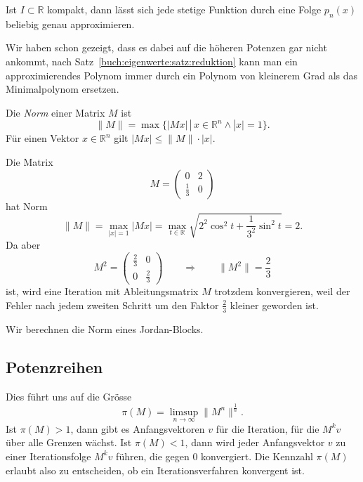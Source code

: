 \begin{satz}
Ist $I\subset\mathbb{R}$ kompakt, dann lässt sich jede stetige Funktion
durch eine Folge $p_n(x)$ beliebig genau approximieren.
\end{satz}

Wir haben schon gezeigt, dass es dabei auf die höheren Potenzen gar nicht
ankommt, nach Satz~\ref{buch:eigenwerte:satz:reduktion} kann man ein
approximierendes Polynom immer durch ein Polynom von kleinerem Grad
als das Minimalpolynom ersetzen.

\begin{definition}
%
Die {\em Norm} einer Matrix $M$ ist
\[
\|M\|
=
\max\{|Mx|\,|\, x\in\mathbb R^n\wedge |x|=1\}.
\]
Für einen Vektor $x\in\mathbb R^n$ gilt $|Mx| \le \|M\|\cdot |x|$.
\end{definition}

\begin{beispiel}
Die Matrix
\[
M=\begin{pmatrix}
0&2\\
\frac13&0
\end{pmatrix}
\]
hat Norm
\[
\|M\|
=
\max_{|x|=1} |Mx| 
=
\max_{t\in\mathbb R} \sqrt{2^2\cos^2 t +\frac1{3^2}\sin^2t} = 2.
\]
Da aber
\[
M^2 = \begin{pmatrix}
\frac{2}{3}&0\\
0&\frac{2}{3}
\end{pmatrix}
\qquad\Rightarrow\qquad \|M^2\|=\frac23
\]
ist, wird eine Iteration mit Ableitungsmatrix $M$ trotzdem
konvergieren, weil der Fehler nach jedem zweiten Schritt um den
Faktor $\frac23$ kleiner geworden ist.
\end{beispiel}

\begin{beispiel}
Wir berechnen die Norm eines Jordan-Blocks.

\end{beispiel}

%
%
\subsection{Potenzreihen
\label{buch:subsection:potenzreihen}}



Dies führt uns auf die Grösse
\begin{equation}
\pi(M)
=
\limsup_{n\to\infty} \|M^n\|^\frac1n.
\label{buch:eqn:gelfand-grenzwert}
\end{equation}
Ist $\pi(M) > 1$, dann gibt es Anfangsvektoren $v$ für die Iteration,
für die $M^kv$ über alle Grenzen wächst.
Ist $\pi(M) < 1$, dann wird jeder Anfangsvektor $v$ zu einer Iterationsfolge
$M^kv$ führen, die gegen $0$ konvergiert.
Die Kennzahl $\pi(M)$ erlaubt also zu entscheiden, ob ein
Iterationsverfahren konvergent ist.
%

